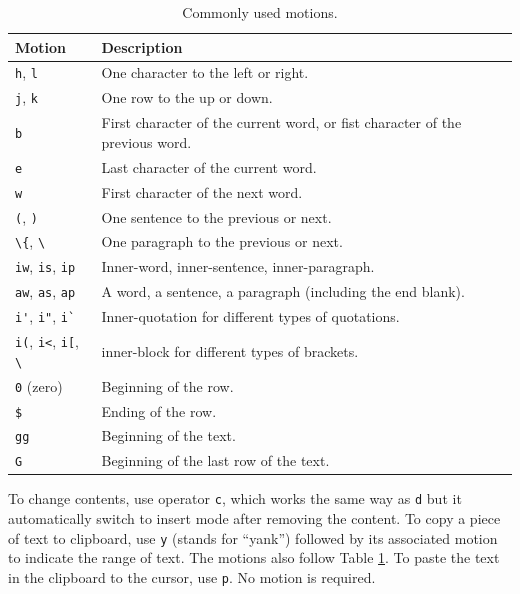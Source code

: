 \begin{table}
  \centering \caption{Commonly used motions.}\label{ch:tfe:tab:motion}
  \begin{tabularx}{\textwidth}{lX}
    \hline
    Motion & Description \\ \hline
    \verb|h|, \verb|l| & One character to the left or right. \\ 
    \verb|j|, \verb|k| & One row to the up or down. \\ 
    \verb|b| & First character of the current word, or fist character of the previous word. \\ 
    \verb|e| & Last character of the current word. \\ 
    \verb|w| & First character of the next word. \\ 
    \verb|(|, \verb|)| & One sentence to the previous or next. \\ 
    \lstinline{\{}, \lstinline{\}} & One paragraph to the previous or next. \\ 
    \verb|iw|, \verb|is|, \verb|ip| & Inner-word, inner-sentence, inner-paragraph. \\ 
    \verb|aw|, \verb|as|, \verb|ap| & A word, a sentence, a paragraph (including the end blank). \\ 
    \verb|i'|, \verb|i"|, \verb|i`| & Inner-quotation for different types of quotations. \\ 
    \verb|i(|, \verb|i<|, \verb|i[|, \lstinline{\}} & inner-block for different types of brackets. \\ 
    \verb|0| (zero) & Beginning of the row. \\ 
    \verb|$| & Ending of the row. \\ 
    \verb|gg| & Beginning of the text. \\ 
    \verb|G| & Beginning of the last row of the text. \\
    \hline
  \end{tabularx}
\end{table}

To change contents, use operator \verb|c|, which works the same way as \verb|d| but it automatically switch to insert mode after removing the content. To copy a piece of text to clipboard, use \verb|y| (stands for ``yank'') followed by its associated motion to indicate the range of text. The motions also follow Table \ref{ch:tfe:tab:motion}. To paste the text in the clipboard to the cursor, use \verb|p|. No motion is required.

